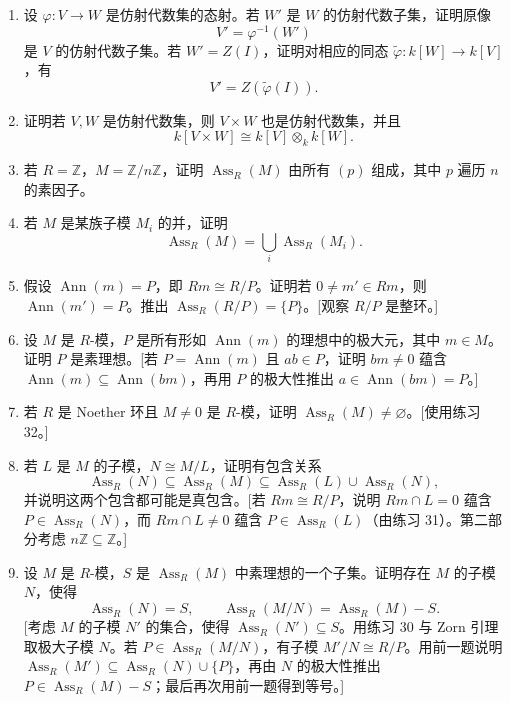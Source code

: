 \begin{enumerate}[label=\arabic*.]
	\item 设 $\varphi:V\to W$ 是仿射代数集的态射。若 $W'$ 是 $W$ 的仿射代数子集，证明原像
	\[
	V'=\varphi^{-1}(W')
	\]
	是 $V$ 的仿射代数子集。若 $W'=Z(I)$，证明对相应的同态 $\widetilde\varphi:k[W]\to k[V]$，有
	\[
	V'=Z(\widetilde\varphi(I)).
	\]
	
	\item 证明若 $V,W$ 是仿射代数集，则 $V\times W$ 也是仿射代数集，并且
	\[
	k[V\times W]\cong k[V]\otimes_k k[W].
	\]
	
	\item 若 $R=\mathbb Z$，$M=\mathbb Z/n\mathbb Z$，证明 $\operatorname{Ass}_R(M)$ 由所有 $(p)$ 组成，其中 $p$ 遍历 $n$ 的素因子。
	
	\item 若 $M$ 是某族子模 $M_i$ 的并，证明
	\[
	\operatorname{Ass}_R(M)=\bigcup_i \operatorname{Ass}_R(M_i).
	\]
	
	\item 假设 $\operatorname{Ann}(m)=P$，即 $Rm\cong R/P$。证明若 $0\ne m'\in Rm$，则 $\operatorname{Ann}(m')=P$。推出 $\operatorname{Ass}_R(R/P)=\{P\}$。[观察 $R/P$ 是整环。]
	
	\item 设 $M$ 是 $R$-模，$P$ 是所有形如 $\operatorname{Ann}(m)$ 的理想中的极大元，其中 $m\in M$。证明 $P$ 是素理想。[若 $P=\operatorname{Ann}(m)$ 且 $ab\in P$，证明 $bm\ne0$ 蕴含 $\operatorname{Ann}(m)\subseteq\operatorname{Ann}(bm)$，再用 $P$ 的极大性推出 $a\in\operatorname{Ann}(bm)=P$。]
	
	\item 若 $R$ 是 Noether 环且 $M\ne0$ 是 $R$-模，证明 $\operatorname{Ass}_R(M)\ne\varnothing$。[使用练习 32。]
	
	\item 若 $L$ 是 $M$ 的子模，$N\cong M/L$，证明有包含关系
	\[
	\operatorname{Ass}_R(N)\subseteq\operatorname{Ass}_R(M)
	\subseteq
	\operatorname{Ass}_R(L)\cup\operatorname{Ass}_R(N),
	\]
	并说明这两个包含都可能是真包含。[若 $Rm\cong R/P$，说明 $Rm\cap L=0$ 蕴含 $P\in\operatorname{Ass}_R(N)$，而 $Rm\cap L\ne0$ 蕴含 $P\in\operatorname{Ass}_R(L)$（由练习 31）。第二部分考虑 $n\mathbb Z\subseteq\mathbb Z$。]
	
	\item 设 $M$ 是 $R$-模，$S$ 是 $\operatorname{Ass}_R(M)$ 中素理想的一个子集。证明存在 $M$ 的子模 $N$，使得
	\[
	\operatorname{Ass}_R(N)=S,
	\qquad
	\operatorname{Ass}_R(M/N)=\operatorname{Ass}_R(M)-S.
	\]
	[考虑 $M$ 的子模 $N'$ 的集合，使得 $\operatorname{Ass}_R(N')\subseteq S$。用练习 30 与 Zorn 引理取极大子模 $N$。若 $P\in\operatorname{Ass}_R(M/N)$，有子模 $M'/N\cong R/P$。用前一题说明 $\operatorname{Ass}_R(M')\subseteq\operatorname{Ass}_R(N)\cup\{P\}$，再由 $N$ 的极大性推出 $P\in\operatorname{Ass}_R(M)-S$；最后再次用前一题得到等号。]
	

\end{enumerate}
